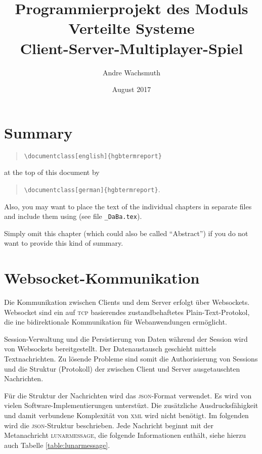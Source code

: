 \documentclass[ngerman,11pt]{report}
\author{Andre Wachsmuth}
\title{Programmierprojekt des Moduls Verteilte Systeme \\ Client-Server-Multiplayer-Spiel}
\date{August 2017}
\begin{document}
\maketitle
\tableofcontents

\chapter*{Summary}

\begin{quote}
 \verb!\documentclass[english]{hgbtermreport}! 
\end{quote}
at the top of this document by
\begin{quote}
 \verb!\documentclass[german]{hgbtermreport}!.
\end{quote}
Also, you may want to place the text of the individual chapters in separate files and 
include them using \verb!! 
(see file \verb!_DaBa.tex!).

Simply omit this chapter (which could also be called ``Abstract'') if you do not want to provide this kind of summary.


\chapter{Websocket-Kommunikation}

Die Kommunikation zwischen Clients und dem Server erfolgt über Websockets. Websocket
sind ein auf \textsc{tcp} basierendes zustandbehaftetes Plain-Text-Protokol, die 
ine bidirektionale Kommunikation für Webanwendungen ermöglicht.

Session-Verwaltung und die Persistierung von Daten während der Session wird von Websockets bereitgestellt.
Der Datenaustausch geschieht mittels Textnachrichten. Zu lösende Probleme sind somit die Authorisierung
von Sessions und die Struktur (Protokoll) der zwischen Client und Server ausgetauschten Nachrichten.

Für die Struktur der Nachrichten wird das \textsc{json}-Format verwendet. Es wird von vielen
Software-Implementierungen unterstüzt. Die zusätzliche Ausdrucksfähigkeit und damit verbundene
Komplexität von \textsc{xml} wird nicht benötigt. Im folgenden wird die \textsc{json}-Struktur
beschrieben. Jede Nachricht beginnt mit der Metanachricht \textsc{lunarmessage}, die folgende
Informationen enthält, siehe hierzu auch Tabelle \ref{table:lunarmessage}.
\end{document}

